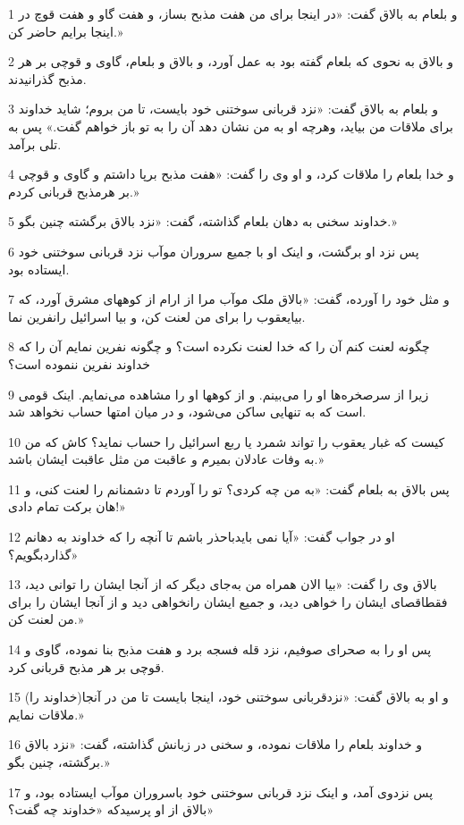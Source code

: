 \par 1 و بلعام به بالاق گفت: «در اینجا برای من هفت مذبح بساز، و هفت گاو و هفت قوچ در اینجا برایم حاضر کن.»
\par 2 و بالاق به نحوی که بلعام گفته بود به عمل آورد، و بالاق و بلعام، گاوی و قوچی بر هر مذبح گذرانیدند.
\par 3 و بلعام به بالاق گفت: «نزد قربانی سوختنی خود بایست، تا من بروم؛ شاید خداوند برای ملاقات من بیاید، وهر‌چه او به من نشان دهد آن را به تو باز خواهم گفت.» پس به تلی برآمد. 
\par 4 و خدا بلعام را ملاقات کرد، و او وی را گفت: «هفت مذبح برپا داشتم و گاوی و قوچی بر هرمذبح قربانی کردم.»
\par 5 خداوند سخنی به دهان بلعام گذاشته، گفت: «نزد بالاق برگشته چنین بگو.»
\par 6 پس نزد او برگشت، و اینک او با جمیع سروران موآب نزد قربانی سوختنی خود ایستاده بود.
\par 7 و مثل خود را آورده، گفت: «بالاق ملک موآب مرا از ارام از کوههای مشرق آورد، که بیایعقوب را برای من لعنت کن، و بیا اسرائیل رانفرین نما.
\par 8 چگونه لعنت کنم آن را که خدا لعنت نکرده است؟ و چگونه نفرین نمایم آن را که خداوند نفرین ننموده است؟
\par 9 زیرا از سرصخره‌ها او را می‌بینم. و از کوهها او را مشاهده می‌نمایم. اینک قومی است که به تنهایی ساکن می‌شود، و در میان امتها حساب نخواهد شد.
\par 10 کیست که غبار یعقوب را تواند شمرد یا ربع اسرائیل را حساب نماید؟ کاش که من به وفات عادلان بمیرم و عاقبت من مثل عاقبت ایشان باشد.»
\par 11 پس بالاق به بلعام گفت: «به من چه کردی؟ تو را آوردم تا دشمنانم را لعنت کنی، و هان برکت تمام دادی!»
\par 12 او در جواب گفت: «آیا نمی بایدباحذر باشم تا آنچه را که خداوند به دهانم گذاردبگویم؟»
\par 13 بالاق وی را گفت: «بیا الان همراه من به‌جای دیگر که از آنجا ایشان را توانی دید، فقطاقصای ایشان را خواهی دید، و جمیع ایشان رانخواهی دید و از آنجا ایشان را برای من لعنت کن.»
\par 14 پس او را به صحرای صوفیم، نزد قله فسجه برد و هفت مذبح بنا نموده، گاوی و قوچی بر هر مذبح قربانی کرد.
\par 15 و او به بالاق گفت: «نزدقربانی سوختنی خود، اینجا بایست تا من در آنجا(خداوند را) ملاقات نمایم.»
\par 16 و خداوند بلعام را ملاقات نموده، و سخنی در زبانش گذاشته، گفت: «نزد بالاق برگشته، چنین بگو.»
\par 17 پس نزدوی آمد، و اینک نزد قربانی سوختنی خود باسروران موآب ایستاده بود، و بالاق از او پرسیدکه «خداوند چه گفت؟»
